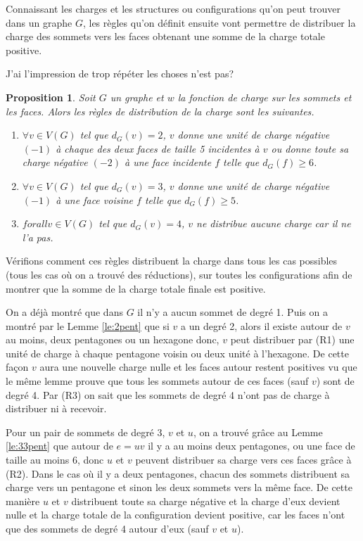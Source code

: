 \documentclass[10pt,a4paper]{article}
\newtheorem{proposition}{Proposition}
\begin{document}
Connaissant les charges et les structures ou configurations qu'on peut trouver dans un graphe $G$, les règles qu'on définit ensuite vont permettre de distribuer la charge des sommets vers les faces obtenant une somme de la charge totale positive.

{\color{blue} J'ai l'impression de trop répéter les choses n'est pas?}

\begin{proposition}
Soit $G$ un graphe et $w$ la fonction de charge sur les sommets et les faces. Alors les règles de distribution de la charge sont les suivantes.

\begin{enumerate}
\item [(R1)] $\forall v \in V(G)$ tel que $d_G(v) = 2$, $v$ donne une unité de charge négative $(-1)$ à chaque des deux faces de taille 5 incidentes à $v$ ou donne toute sa charge négative $(-2)$ à une face incidente $f$ telle que $d_G(f) \geq 6$.
\item [(R2)] $\forall v \in V(G)$ tel que $d_G(v) = 3$, $v$ donne une unité de charge négative $(-1)$ à une face voisine $f$ telle que $d_G(f) \geq 5$.
\item [(R3)] $forall v \in V(G)$ tel que $d_G(v) = 4$, $v$ ne distribue aucune charge car il ne l'a pas.
\end{enumerate}
\end{proposition}

Vérifions comment ces règles distribuent la charge dans tous les cas possibles (tous les cas où on a trouvé des réductions), sur toutes les configurations afin de montrer que la somme de la charge totale finale est positive.

On a déjà montré que dans $G$ il n'y a aucun sommet de degré 1. Puis on a montré par le Lemme \ref{le:2pent} que si $v$ a un degré 2, alors il existe autour de $v$ au moins, deux pentagones ou un hexagone donc, $v$ peut distribuer par (R1) une unité de charge à chaque pentagone voisin ou deux unité à l'hexagone. De cette façon $v$ aura une nouvelle charge nulle et les faces autour restent positives vu que le même lemme prouve que tous les sommets autour de ces faces (sauf $v$) sont de degré 4. Par (R3) on sait que les sommets de degré 4 n'ont pas de charge à distribuer ni à recevoir.

Pour un pair de sommets de degré 3, $v$ et $u$, on a trouvé grâce au Lemme \ref{le:33pent} que autour de $e = uv$ il y a au moins deux pentagones, ou une face de taille au moins 6, donc $u$ et $v$ peuvent distribuer sa charge vers ces faces grâce à (R2). Dans le cas où il y a deux pentagones, chacun des sommets distribuent sa charge vers un pentagone et sinon les deux sommets vers la même face. De cette manière $u$ et $v$ distribuent toute sa charge négative et la charge d'eux devient nulle et la charge totale de la configuration devient positive, car les faces n'ont que des sommets de degré 4 autour d'eux (sauf $v$ et $u$).
\end{document}
